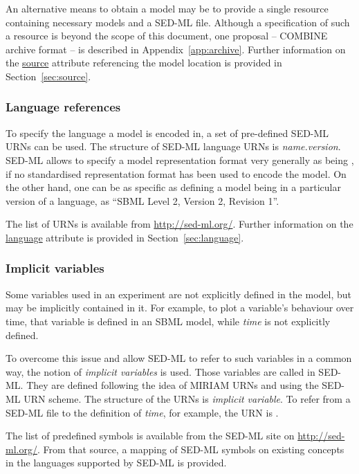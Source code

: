 An alternative means to obtain a model may be to provide a single resource containing necessary models and a SED-ML file. Although a specification of such a resource is beyond the scope of this document,  one proposal  --  COMBINE archive format -- is  described in Appendix~\ref{app:archive}.
Further information on the \hyperref[sec:source]{source} attribute referencing the model location is provided in Section~\ref{sec:source}.

\subsubsection{Language references}
\label{sec:languageURI}
To specify the language a model is encoded in, a set of pre-defined SED-ML URNs can be used. 
The structure of SED-ML language URNs is \emph{name.version}. 
SED-ML allows to specify a model representation format very generally as being , if no standardised representation format has been used to encode the model. On the other hand, one can be as specific as defining
a model being in a particular version of a language, as ``SBML Level 2, Version 2, Revision 1''.

The list of URNs is available from \url{http://sed-ml.org/}. 
Further information on the \hyperref[sec:language]{language} attribute is provided in Section~\ref{sec:language}.

\subsubsection{Implicit variables}
\label{sec:implicitVariable}

Some variables used in an experiment are not explicitly defined in the model, but may be implicitly contained in it. 
For example, to plot a variable's behaviour over time, that variable is defined in an SBML model, while \emph{time} is not explicitly defined. 

To overcome this issue and allow SED-ML to refer to such variables in a common way, the notion of \emph{implicit variables} is used.
Those variables are called  in SED-ML. They are defined following the idea of MIRIAM URNs and using the SED-ML URN scheme. The structure of the URNs is \emph{implicit variable}.
To refer from a SED-ML file to the definition of \emph{time}, for example, the URN is .

The list of predefined symbols is available from the SED-ML site on \url{http://sed-ml.org/}.
From that source, a mapping of SED-ML symbols on existing concepts in the languages supported by SED-ML is provided.

